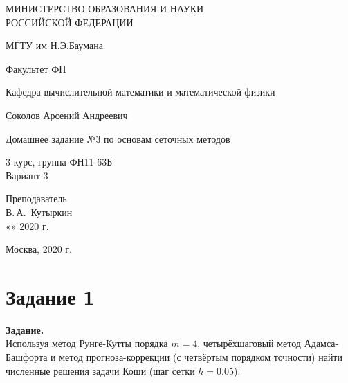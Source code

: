 \documentclass[14pt,a4paper]{scrartcl}
\begin{document}
	\begin{titlepage}
	\begin{center}
		\large
		МИНИСТЕРСТВО ОБРАЗОВАНИЯ И НАУКИ\\ РОССИЙСКОЙ ФЕДЕРАЦИИ
		
		\vspace{0.5cm}
		
		МГТУ им Н.Э.Баумана
		\vspace{0.25cm}
		
		Факультет ФН
		
		Кафедра вычислительной математики и математической физики
		\vfill
		
		
		Соколов Арсений Андреевич\\
		\vfill
		
		
		{\LARGE Домашнее задание №3 по основам сеточных методов \\[2mm]
		}
		\bigskip
		
		3 курс, группа ФН11-63Б\\
		Вариант 3
	\end{center}
	\vfill
	
	\newlength{\ML}
	\hfill\begin{minipage}{0.4\textwidth}
		Преподаватель\\
		\underline{\hspace{3cm}} В.\,А.~Кутыркин\\
		«\underline{\hspace{0.7cm}}» \underline{\hspace{1.71cm}} 2020 г.
	\end{minipage}%
	\bigskip
	
	
	\vfill
	
	\begin{center}
		Москва, 2020 г.
	\end{center}
\end{titlepage}

\section*{Задание 1}
\textbf{Задание.}\\

Используя метод Рунге-Кутты порядка $m = 4$, четырёхшаговый метод Адамса-Башфорта и метод прогноза-коррекции (с четвёртым порядком точности) найти численные решения задачи Коши (шаг сетки $h = 0.05$):
\end{document}
